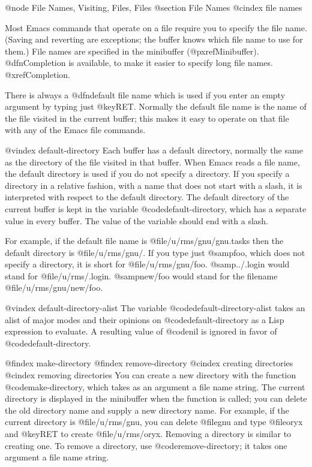 {{{{{{{{{{{{{{{{@node File Names, Visiting, Files, Files
@section File Names
@cindex file names

  Most Emacs commands that operate on a file require you to specify the
file name.  (Saving and reverting are exceptions; the buffer knows which
file name to use for them.)  File names are specified in the minibuffer
(@pxref{Minibuffer}).  @dfn{Completion} is available, to make it easier to
specify long file names.  @xref{Completion}.

  There is always a @dfn{default file name} which is used if you
enter an empty argument by typing just @key{RET}.  Normally the default
file name is the name of the file visited in the current buffer; this
makes it easy to operate on that file with any of the Emacs file
commands.

@vindex default-directory
  Each buffer has a default directory, normally the same as the
directory of the file visited in that buffer.  When Emacs reads a file
name, the default directory is used if you do not specify a directory.
If you specify a directory in a relative fashion, with a name that does
not start with a slash, it is interpreted with respect to the default
directory.  The default directory of the current buffer is kept in the
variable @code{default-directory}, which has a separate value in every
buffer.  The value of the variable should end with a slash.

  For example, if the default file name is @file{/u/rms/gnu/gnu.tasks} then
the default directory is @file{/u/rms/gnu/}.  If you type just @samp{foo},
which does not specify a directory, it is short for @file{/u/rms/gnu/foo}.
@samp{../.login} would stand for @file{/u/rms/.login}.  @samp{new/foo}
would stand for the filename @file{/u/rms/gnu/new/foo}.

@vindex default-directory-alist
The variable @code{default-directory-alist} takes an alist of major
modes and their opinions on @code{default-directory} as a Lisp
expression to evaluate.  A resulting value of @code{nil} is ignored in
favor of @code{default-directory}.

@findex make-directory
@findex remove-directory
@cindex creating directories
@cindex removing directories
You can create a new directory with the function @code{make-directory},
which takes as an argument a file name string. The current directory is
displayed in the minibuffer when the function is called; you can delete
the old directory name and supply a new directory name. For example, if
the current directory is @file{/u/rms/gnu}, you can delete @file{gnu}
and type @file{oryx} and @key{RET} to create @file{/u/rms/oryx}.
Removing a directory is similar to creating one.  To remove a directory,
use @code{remove-directory}; it takes one argument a file name string.

}}}}}}}}}}}}}}}}
